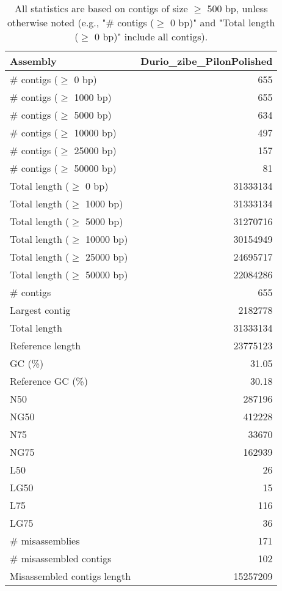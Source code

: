 \documentclass[12pt,a4paper]{article}
\begin{document}
\begin{table}[ht]
\begin{center}
\caption{All statistics are based on contigs of size $\geq$ 500 bp, unless otherwise noted (e.g., "\# contigs ($\geq$ 0 bp)" and "Total length ($\geq$ 0 bp)" include all contigs).}
\begin{tabular}{|l*{1}{|r}|}
\hline
Assembly & Durio\_zibe\_PilonPolished \\ \hline
\# contigs ($\geq$ 0 bp) & 655 \\ \hline
\# contigs ($\geq$ 1000 bp) & 655 \\ \hline
\# contigs ($\geq$ 5000 bp) & 634 \\ \hline
\# contigs ($\geq$ 10000 bp) & 497 \\ \hline
\# contigs ($\geq$ 25000 bp) & 157 \\ \hline
\# contigs ($\geq$ 50000 bp) & 81 \\ \hline
Total length ($\geq$ 0 bp) & 31333134 \\ \hline
Total length ($\geq$ 1000 bp) & 31333134 \\ \hline
Total length ($\geq$ 5000 bp) & 31270716 \\ \hline
Total length ($\geq$ 10000 bp) & 30154949 \\ \hline
Total length ($\geq$ 25000 bp) & 24695717 \\ \hline
Total length ($\geq$ 50000 bp) & 22084286 \\ \hline
\# contigs & 655 \\ \hline
Largest contig & 2182778 \\ \hline
Total length & 31333134 \\ \hline
Reference length & 23775123 \\ \hline
GC (\%) & 31.05 \\ \hline
Reference GC (\%) & 30.18 \\ \hline
N50 & 287196 \\ \hline
NG50 & 412228 \\ \hline
N75 & 33670 \\ \hline
NG75 & 162939 \\ \hline
L50 & 26 \\ \hline
LG50 & 15 \\ \hline
L75 & 116 \\ \hline
LG75 & 36 \\ \hline
\# misassemblies & 171 \\ \hline
\# misassembled contigs & 102 \\ \hline
Misassembled contigs length & 15257209 \\ \hline

\end{tabular}
\end{center}
\end{table}
\end{document}
